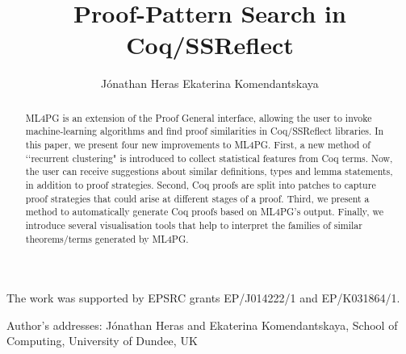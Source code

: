 \documentclass[acmtocl]{acmsmall}
\begin{document}
 

\title{Proof-Pattern Search in Coq/SSReflect}

%
\author{J\'onathan Heras
Ekaterina Komendantskaya
}
%




\begin{abstract}
ML4PG is an extension of the Proof General interface, allowing
the user to invoke machine-learning algorithms and find proof similarities
in Coq/SSReflect libraries. In this paper, we present four new improvements to
ML4PG.
First, a new method of \lq\lq{}recurrent clustering" is introduced to collect statistical features from Coq terms.
Now, the user can receive suggestions about similar definitions,
types and lemma statements, in addition to proof strategies. Second, Coq
proofs are split into patches to capture proof strategies that could arise
at different stages of a proof. Third, we present a method to automatically generate Coq proofs based on ML4PG's output. Finally,
we introduce several visualisation tools that help to interpret the families of similar theorems/terms generated by ML4PG.
\end{abstract}




\terms{}





\begin{bottomstuff}
The work was supported by EPSRC grants EP/J014222/1 and EP/K031864/1.

Author's addresses: J\'onathan Heras and Ekaterina Komendantskaya,
School of Computing, University of Dundee, UK
\end{bottomstuff}
\end{document}
